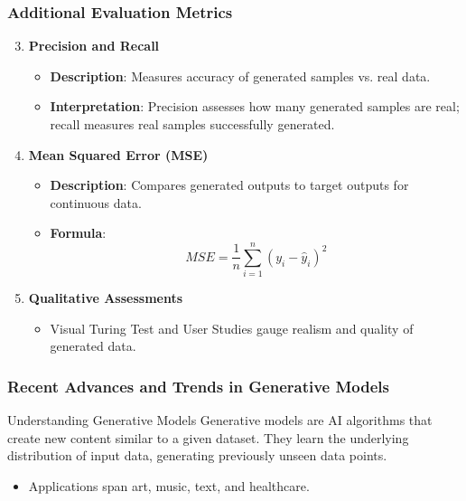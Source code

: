 \documentclass[aspectratio=169]{beamer}
\begin{document}
\begin{frame}[fragile]
    \frametitle{Additional Evaluation Metrics}
    \begin{enumerate}\setcounter{enumi}{2}
        \item \textbf{Precision and Recall}  
        \begin{itemize}
            \item \textbf{Description}: Measures accuracy of generated samples vs. real data.
            \item \textbf{Interpretation}: Precision assesses how many generated samples are real; recall measures real samples successfully generated.
        \end{itemize}
        
        \item \textbf{Mean Squared Error (MSE)}  
        \begin{itemize}
            \item \textbf{Description}: Compares generated outputs to target outputs for continuous data.
            \item \textbf{Formula}:
            \begin{equation}
                MSE = \frac{1}{n} \sum_{i=1}^n (y_i - \hat{y}_i)^2
            \end{equation}
        \end{itemize}
        
        \item \textbf{Qualitative Assessments}  
        \begin{itemize}
            \item Visual Turing Test and User Studies gauge realism and quality of generated data.
        \end{itemize}
    \end{enumerate}
\end{frame}

\begin{frame}[fragile]
    \frametitle{Recent Advances and Trends in Generative Models}
    
    \begin{block}{Understanding Generative Models}
        Generative models are AI algorithms that create new content similar to a given dataset. They learn the underlying distribution of input data, generating previously unseen data points. 
    \end{block}
    
    \begin{itemize}
        \item Applications span art, music, text, and healthcare.
    \end{itemize}
\end{frame}
\end{document}

